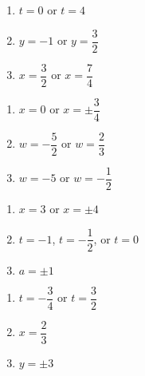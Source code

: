 \documentclass{ximera}
\begin{document}
\begin{multicols}{3}
\begin{enumerate}
\setcounter{enumi}{\value{HW}}

\item   $t = 0$ or $t = 4$
\item   $y = -1$ or $y = \dfrac{3}{2}$ 
\item   $x = \dfrac{3}{2}$ or $x = \dfrac{7}{4}$ 

\setcounter{HW}{\value{enumi}}
\end{enumerate}
\end{multicols}


\begin{multicols}{3}
\begin{enumerate}
\setcounter{enumi}{\value{HW}}

\item $x = 0$ or $x = \pm \dfrac{3}{4}$ 
\item $w = -\dfrac{5}{2}$ or $w = \dfrac{2}{3}$
\item $w=-5$ or $w = -\dfrac{1}{2}$

\setcounter{HW}{\value{enumi}}
\end{enumerate}
\end{multicols}


\begin{multicols}{3}
\begin{enumerate}
\setcounter{enumi}{\value{HW}}

\item $x=3$ or $x = \pm 4$ 
\item $t = -1$, $t= -\dfrac{1}{2}$, or $t = 0$
\item $a = \pm 1$

\setcounter{HW}{\value{enumi}}
\end{enumerate}
\end{multicols}

\begin{multicols}{3}
\begin{enumerate}
\setcounter{enumi}{\value{HW}}

\item $t = -\dfrac{3}{4}$ or $t = \dfrac{3}{2}$
\item $x = \dfrac{2}{3}$
\item $y = \pm 3$  
\setcounter{HW}{\value{enumi}}
\end{enumerate}
\end{multicols}
\end{document}
